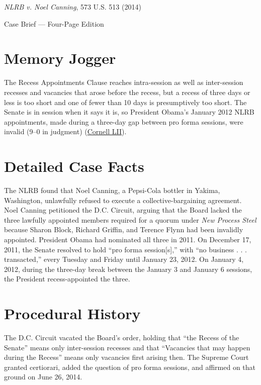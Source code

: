 \documentclass[12pt]{article}
\begin{document}
\begin{center}
{\LARGE \textit{NLRB v. Noel Canning}, 573 U.S. 513 (2014)\par}
\vspace{0.8em}
{\large Case Brief --- Four-Page Edition\par}
\end{center}
\vspace{1em}

\section{Memory Jogger}

The Recess Appointments Clause reaches intra-session as well as inter-session recesses and vacancies that arose before the recess, but a recess of three days or less is too short and one of fewer than 10 days is presumptively too short. The Senate is in session when it says it is, so President Obama's January 2012 NLRB appointments, made during a three-day gap between pro forma sessions, were invalid (9--0 in judgment) (\href{https://www.law.cornell.edu/supremecourt/text/12-1281}{Cornell LII}).

\section{Detailed Case Facts}

The NLRB found that Noel Canning, a Pepsi-Cola bottler in Yakima, Washington, unlawfully refused to execute a collective-bargaining agreement. Noel Canning petitioned the D.C. Circuit, arguing that the Board lacked the three lawfully appointed members required for a quorum under \textit{New Process Steel} because Sharon Block, Richard Griffin, and Terence Flynn had been invalidly appointed. President Obama had nominated all three in 2011. On December 17, 2011, the Senate resolved to hold ``pro forma session[s],'' with ``no business . . . transacted,'' every Tuesday and Friday until January 23, 2012. On January 4, 2012, during the three-day break between the January 3 and January 6 sessions, the President recess-appointed the three.

\section{Procedural History}

The D.C. Circuit vacated the Board's order, holding that ``the Recess of the Senate'' means only inter-session recesses and that ``Vacancies that may happen during the Recess'' means only vacancies first arising then. The Supreme Court granted certiorari, added the question of pro forma sessions, and affirmed on that ground on June 26, 2014.
\end{document}
